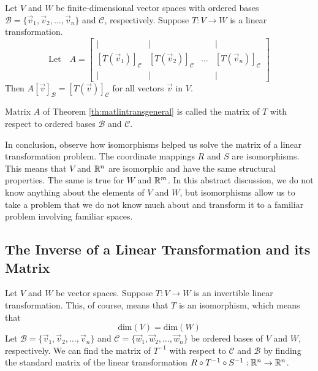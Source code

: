 \documentclass{ximera}
\begin{document}
\begin{theorem}\label{th:matlintransgeneral}
Let $V$ and $W$ be finite-dimensional vector spaces with ordered bases $\mathcal{B}=\{\vec{v}_1,\vec{v}_2,\ldots,\vec{v}_n\}$ and $\mathcal{C}$, respectively.  Suppose $T:V\rightarrow W$ is a linear transformation.  
$$\text{Let}\quad A=\begin{bmatrix}
           | & |& &|\\
		[T(\vec{v}_1)]_{\mathcal{C}} & [T(\vec{v}_2)]_{\mathcal{C}}&\dots &[T(\vec{v}_n)]_{\mathcal{C}}\\
		|&| & &|
         \end{bmatrix}$$
Then $A[\vec{v}]_{\mathcal{B}}=[T(\vec{v})]_{\mathcal{C}}$ for all vectors $\vec{v}$ in $V$.       
\end{theorem}

\begin{definition}\label{def:matlintransgenera}
Matrix $A$ of Theorem \ref{th:matlintransgeneral} is called the matrix of $T$ with respect to ordered bases $\mathcal{B}$ and $\mathcal{C}$.
\end{definition}

In conclusion, observe how isomorphisms helped us solve the matrix of a linear transformation problem.  The coordinate mappings $R$ and $S$ are isomorphisms.  This means that $V$ and $\mathbb{R}^n$ are isomorphic and have the same structural properties.  The same is true for $W$ and $\mathbb{R}^m$.  In this abstract discussion, we do not know anything about the elements of $V$ and $W$, but isomorphisms allow us to take a problem that we do not know much about and transform it to a familiar problem involving familiar spaces.

\subsection*{The Inverse of a Linear Transformation and its Matrix}

Let $V$ and $W$ be vector spaces.  Suppose $T:V\rightarrow W$ is an invertible linear transformation.  This, of course, means that $T$ is an isomorphism, which means that 
$$\mbox{dim}(V)=\mbox{dim}(W)$$
Let
$\mathcal{B}=\{\vec{v}_1, \vec{v}_2,\ldots ,\vec{v}_n\}$ and $\mathcal{C}=\{\vec{w}_1, \vec{w}_2,\ldots ,\vec{w}_n\}$ be ordered bases of $V$ and $W$, respectively.   We can find the matrix of $T^{-1}$ with respect to $\mathcal{C}$ and $\mathcal{B}$ by finding the standard matrix of the linear transformation $R\circ T^{-1}\circ S^{-1}:\mathbb{R}^n\rightarrow \mathbb{R}^n$.
\end{document}
